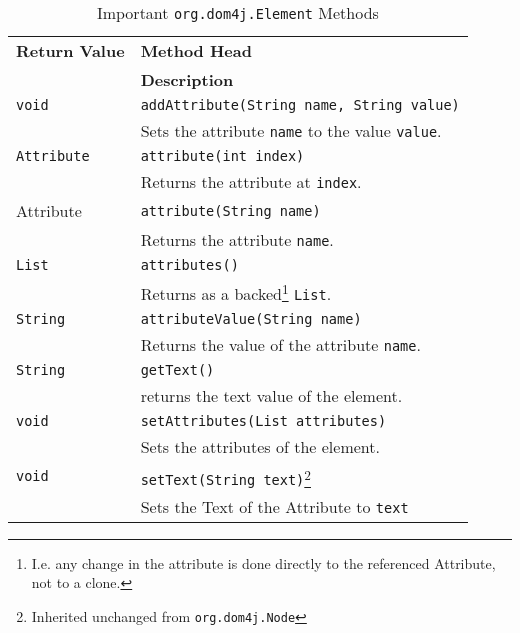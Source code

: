 \begin{table}[htbp]
	\centering
		\begin{tabular}{ll}
			\textbf{Return Value} & \textbf{Method Head} \\
			& \textbf{Description} \\
			
			\texttt{void} & \texttt{addAttribute(String name, String value)} \\ 
			& Sets the attribute \texttt{name} to the value \texttt{value}.\\
			
			\texttt{Attribute} & \texttt{attribute(int index)} \\
			& Returns the attribute at \texttt{index}.\\
			
			\ttfamily Attribute & \texttt{attribute(String name)}\\
			& Returns the attribute \texttt{name}.\\
			 
			\texttt{List} & \texttt{attributes()}\\
			& Returns as a backed\footnote{I.e. any change in the attribute is 
			  done directly to the referenced Attribute, not to a clone.} \texttt{List}.\\
			  
			\texttt{String} & \texttt{attributeValue(String name)}\\
			& Returns the value of the attribute \texttt{name}.\\
			  
			\texttt{String} & \texttt{getText()}\\
			& returns the text value of the element.\\
			
			\texttt{void} & \texttt{setAttributes(List attributes)}\\
			& Sets the attributes of the element.\\
			
			\texttt{void} & \texttt{setText(String text)}\footnote{Inherited unchanged from \texttt{org.dom4j.Node}}\\
			& Sets the Text of the Attribute to \texttt{text}\\
			
			  
		\end{tabular}
	\caption{Important \texttt{org.dom4j.Element} Methods}
	\label{tab:dom4jElementMethods}
\end{table}